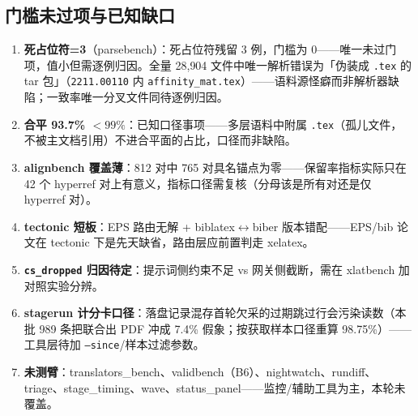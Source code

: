 \subsection{门槛未过项与已知缺口}

\begin{enumerate}
  \item \textbf{死占位符=3}（parsebench）：死占位符残留 3 例，门槛为 0——唯一未过门项，值小但需逐例归因。全量 28{,}904 文件中唯一解析错误为「伪装成 \texttt{.tex} 的 tar 包」（\texttt{2211.00110} 内 \texttt{affinity\_mat.tex}）——语料源怪癖而非解析器缺陷；一致率唯一分叉文件同待逐例归因。
  \item \textbf{合平 93.7\% $<99\%$}：已知口径事项——多层语料中附属 \texttt{.tex}（孤儿文件，不被主文档引用）不进合平面的占比，口径而非缺陷。
  \item \textbf{alignbench 覆盖薄}：812 对中 765 对具名锚点为零——保留率指标实际只在 42 个 hyperref 对上有意义，指标口径需复核（分母该是所有对还是仅 hyperref 对）。
  \item \textbf{tectonic 短板}：EPS 路由无解 + biblatex$\leftrightarrow$biber 版本错配——EPS/bib 论文在 tectonic 下是先天缺省，路由层应前置判走 xelatex。
  \item \textbf{\texttt{cs\_dropped} 归因待定}：提示词侧约束不足 vs 网关侧截断，需在 xlatbench 加对照实验分辨。
  \item \textbf{stagerun 计分卡口径}：落盘记录混存首轮欠采的过期跳过行会污染读数（本批 989 条把联合出 PDF 冲成 7.4\% 假象；按获取样本口径重算 98.75\%）——工具层待加 \texttt{--since}/样本过滤参数。
  \item \textbf{未测臂}：translators\_bench、validbench（B6）、nightwatch、rundiff、triage、stage\_timing、wave、status\_panel——监控/辅助工具为主，本轮未覆盖。
\end{enumerate}
